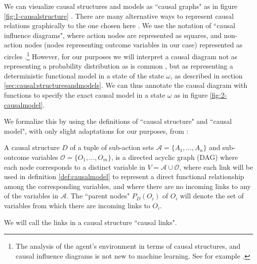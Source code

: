 We can visualize causal structures and models as ``causal graphs" as in figure \ref{fig:1-causalstructure} \citep{Pearl2000}. There are many alternative ways to represent causal relations graphically to the one chosen here \citep{Dawid2002}. We use the notation of ``causal influence diagrams", where action nodes are represented as squares, and non-action nodes (nodes representing outcome variables in our case) represented as circles \citep{Howard1981}.\footnote{The analysis of the agent's environment in terms of causal structures, and causal influence diagrams is not new to machine learning. See for example \citep{Everitt2019}. } However, for our purposes we will interpret a causal diagram not as representing a probability distribution as is common \citep{Howard1981,Dawid2002,Everitt2019}, but as representing a deterministic functional model in a state of the state $\omega$, as described in section \ref{sec:causal:structuresandmodels}. We can thus annotate the causal diagram with functions to specify the exact causal model in a state $\omega$ as in figure \ref{fig:2-causalmodel}. 



We formalize this by using the definitions of ``causal structure" and ``causal model", with only slight adaptations for our purposes, from \citet{Pearl2000}:




\begin{definition}  \label{def:causalstructure}
	A causal structure $D$ of a tuple of sub-action sets $\mathcal A=\{A_1,...,A_n\}$ and sub-outcome variables $\mathcal O=\{O_1,...,O_m\}$, is a directed acyclic graph (DAG) where each node corresponds to a distinct variable in $V=\mathcal A\cup \mathcal O$, where each link will be used in definition \ref{def:causalmodel} to represent a direct functional relationship among the corresponding variables, and where there are no incoming links to any of the variables in $\mathcal A$. The ``parent nodes" $P_D(O_i)$ of $O_i$ will denote the set of variables from which there are incoming links to $O_i$.
\end{definition}

We will call the links in a causal structure ``causal links". 


